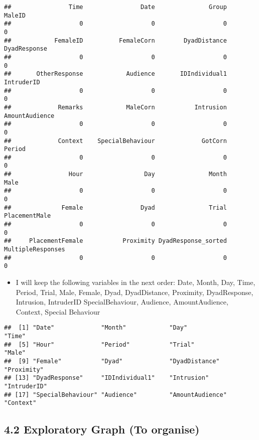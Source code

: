 \documentclass[
]{article}
\providecommand{\tightlist}{%
  \setlength{\itemsep}{0pt}\setlength{\parskip}{0pt}}
\begin{document}
\begin{verbatim}
##                Time                Date               Group              MaleID 
##                   0                   0                   0                   0 
##            FemaleID          FemaleCorn        DyadDistance        DyadResponse 
##                   0                   0                   0                   0 
##       OtherResponse            Audience       IDIndividual1          IntruderID 
##                   0                   0                   0                   0 
##             Remarks            MaleCorn           Intrusion      AmountAudience 
##                   0                   0                   0                   0 
##             Context    SpecialBehaviour             GotCorn              Period 
##                   0                   0                   0                   0 
##                Hour                 Day               Month                Male 
##                   0                   0                   0                   0 
##              Female                Dyad               Trial       PlacementMale 
##                   0                   0                   0                   0 
##     PlacementFemale           Proximity DyadResponse_sorted   MultipleResponses 
##                   0                   0                   0                   0
\end{verbatim}

\begin{itemize}
\tightlist
\item
  I will keep the following variables in the next order: Date, Month,
  Day, Time, Period, Trial, Male, Female, Dyad, DyadDistance, Proximity,
  DyadResponse, Intrusion, IntruderID SpecialBehaviour, Audience,
  AmountAudience, Context, Special Behaviour
\end{itemize}

\begin{verbatim}
##  [1] "Date"             "Month"            "Day"              "Time"            
##  [5] "Hour"             "Period"           "Trial"            "Male"            
##  [9] "Female"           "Dyad"             "DyadDistance"     "Proximity"       
## [13] "DyadResponse"     "IDIndividual1"    "Intrusion"        "IntruderID"      
## [17] "SpecialBehaviour" "Audience"         "AmountAudience"   "Context"
\end{verbatim}

\hypertarget{exploratory-graph-to-organise}{%
\subsection{4.2 Exploratory Graph (To
organise)}\label{exploratory-graph-to-organise}}
\end{document}
